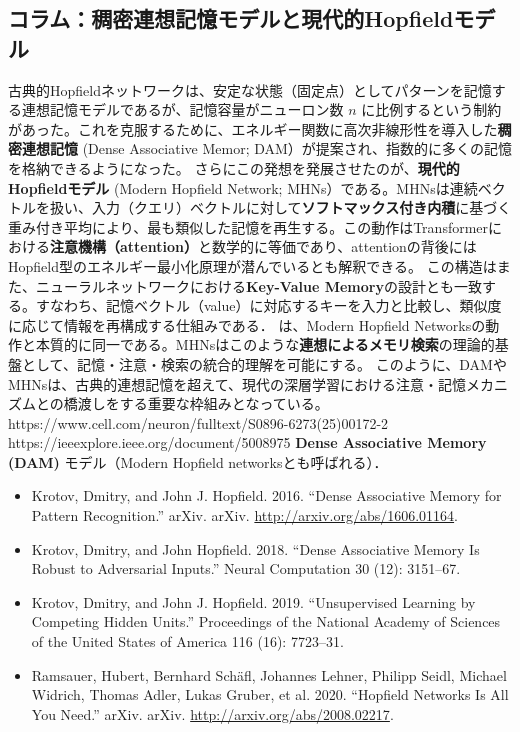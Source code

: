 \subsection{コラム：稠密連想記憶モデルと現代的Hopfieldモデル}
古典的Hopfieldネットワークは、安定な状態（固定点）としてパターンを記憶する連想記憶モデルであるが、記憶容量がニューロン数 $n$ に比例するという制約があった。これを克服するために、エネルギー関数に高次非線形性を導入した\textbf{稠密連想記憶} (Dense Associative Memor; DAM）が提案され、指数的に多くの記憶を格納できるようになった。
さらにこの発想を発展させたのが、\textbf{現代的Hopfieldモデル} (Modern Hopfield Network; MHNs）である。MHNsは連続ベクトルを扱い、入力（クエリ）ベクトルに対して\textbf{ソフトマックス付き内積}に基づく重み付き平均により、最も類似した記憶を再生する。この動作はTransformerにおける\textbf{注意機構（attention）}と数学的に等価であり、attentionの背後にはHopfield型のエネルギー最小化原理が潜んでいるとも解釈できる。
この構造はまた、ニューラルネットワークにおける\textbf{Key-Value Memory}の設計とも一致する。すなわち、記憶ベクトル（value）に対応するキーを入力と比較し、類似度に応じて情報を再構成する仕組みである．
は、Modern Hopfield Networksの動作と本質的に同一である。MHNsはこのような\textbf{連想によるメモリ検索}の理論的基盤として、記憶・注意・検索の統合的理解を可能にする。
このように、DAMやMHNsは、古典的連想記憶を超えて、現代の深層学習における注意・記憶メカニズムとの橋渡しをする重要な枠組みとなっている。
https://www.cell.com/neuron/fulltext/S0896-6273(25)00172-2
https://ieeexplore.ieee.org/document/5008975
\textbf{Dense Associative Memory (DAM)} モデル（Modern Hopfield networksとも呼ばれる）．
\begin{itemize}
\item Krotov, Dmitry, and John J. Hopfield. 2016. “Dense Associative Memory for Pattern Recognition.” arXiv. arXiv. \url{http://arxiv.org/abs/1606.01164}.
\item Krotov, Dmitry, and John Hopfield. 2018. “Dense Associative Memory Is Robust to Adversarial Inputs.” Neural Computation 30 (12): 3151–67.
\item Krotov, Dmitry, and John J. Hopfield. 2019. “Unsupervised Learning by Competing Hidden Units.” Proceedings of the National Academy of Sciences of the United States of America 116 (16): 7723–31.
\item Ramsauer, Hubert, Bernhard Schäfl, Johannes Lehner, Philipp Seidl, Michael Widrich, Thomas Adler, Lukas Gruber, et al. 2020. “Hopfield Networks Is All You Need.” arXiv. arXiv. \url{http://arxiv.org/abs/2008.02217}.
\end{itemize}
